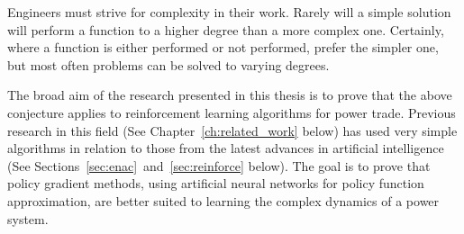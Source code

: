 Engineers must strive for complexity in their work.  Rarely will a simple
solution will perform a function to a higher degree than a more complex one.
Certainly, where a function is either performed or not performed, prefer the
simpler one, but most often problems can be solved to varying degrees.

The broad aim of the research presented in this thesis is to prove that the
above conjecture applies to reinforcement learning algorithms for power trade.
Previous research in this field (See Chapter~\ref{ch:related_work} below) has
used very simple algorithms in relation to those from the latest advances in
artificial intelligence (See Sections~\ref{sec:enac}~and~\ref{sec:reinforce}
below).  The goal is to prove that policy gradient methods, using artificial
neural networks for policy function approximation, are better suited to
learning the complex dynamics of a power system.

